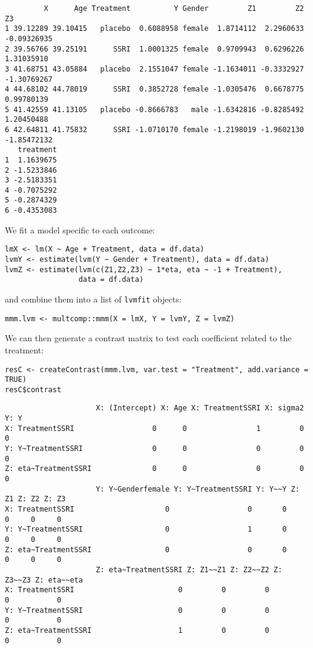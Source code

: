 \documentclass[12pt]{article}
\begin{document}
\begin{verbatim}
         X      Age Treatment          Y Gender         Z1         Z2          Z3
1 39.12289 39.10415   placebo  0.6088958 female  1.8714112  2.2960633 -0.09326935
2 39.56766 39.25191      SSRI  1.0001325 female  0.9709943  0.6296226  1.31035910
3 41.68751 43.05884   placebo  2.1551047 female -1.1634011 -0.3332927 -1.30769267
4 44.68102 44.78019      SSRI  0.3852728 female -1.0305476  0.6678775  0.99780139
5 41.42559 41.13105   placebo -0.8666783   male -1.6342816 -0.8285492  1.20450488
6 42.64811 41.75832      SSRI -1.0710170 female -1.2198019 -1.9602130 -1.85472132
   treatment
1  1.1639675
2 -1.5233846
3 -2.5183351
4 -0.7075292
5 -0.2874329
6 -0.4353083
\end{verbatim}

We fit a model specific to each outcome:
\lstset{language=r,label= ,caption= ,captionpos=b,numbers=none}
\begin{lstlisting}
lmX <- lm(X ~ Age + Treatment, data = df.data)
lvmY <- estimate(lvm(Y ~ Gender + Treatment), data = df.data)
lvmZ <- estimate(lvm(c(Z1,Z2,Z3) ~ 1*eta, eta ~ -1 + Treatment), 
				 data = df.data)
\end{lstlisting}

and combine them into a list of \texttt{lvmfit} objects:
\lstset{language=r,label= ,caption= ,captionpos=b,numbers=none}
\begin{lstlisting}
mmm.lvm <- multcomp::mmm(X = lmX, Y = lvmY, Z = lvmZ)
\end{lstlisting}

We can then generate a contrast matrix to test each coefficient
related to the treatment:
\lstset{language=r,label= ,caption= ,captionpos=b,numbers=none}
\begin{lstlisting}
resC <- createContrast(mmm.lvm, var.test = "Treatment", add.variance = TRUE)
resC$contrast
\end{lstlisting}

\begin{verbatim}
                     X: (Intercept) X: Age X: TreatmentSSRI X: sigma2 Y: Y
X: TreatmentSSRI                  0      0                1         0    0
Y: Y~TreatmentSSRI                0      0                0         0    0
Z: eta~TreatmentSSRI              0      0                0         0    0
                     Y: Y~Genderfemale Y: Y~TreatmentSSRI Y: Y~~Y Z: Z1 Z: Z2 Z: Z3
X: TreatmentSSRI                     0                  0       0     0     0     0
Y: Y~TreatmentSSRI                   0                  1       0     0     0     0
Z: eta~TreatmentSSRI                 0                  0       0     0     0     0
                     Z: eta~TreatmentSSRI Z: Z1~~Z1 Z: Z2~~Z2 Z: Z3~~Z3 Z: eta~~eta
X: TreatmentSSRI                        0         0         0         0           0
Y: Y~TreatmentSSRI                      0         0         0         0           0
Z: eta~TreatmentSSRI                    1         0         0         0           0
\end{verbatim}
\end{document}

